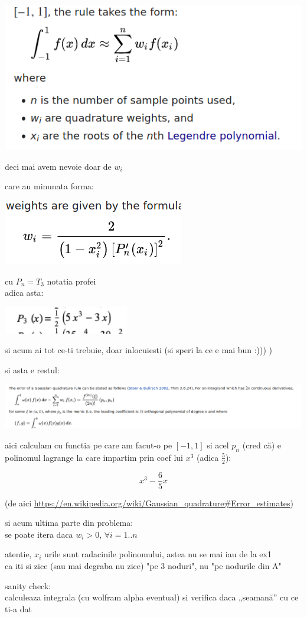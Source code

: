 \documentclass[11pt]{article}
\begin{document}
\begin{center}
\includegraphics[width=.6\linewidth]{./formula.png}
\end{center}

deci mai avem nevoie doar de \(w_i\)
\medskip

care au minunata forma:

\begin{center}
\includegraphics[width=.4\linewidth]{./w_i.png}
\end{center}

cu \(P_n = T_3\) notatia profei\\
adica asta:

\begin{center}
\includegraphics[width=.4\linewidth]{./lagrange3.png}
\end{center}

si acum ai tot ce-ti trebuie, doar inlocuiesti
(si speri la ce e mai bun :))) )
\medskip

si asta e restul:

\begin{center}
\includegraphics[width=\linewidth]{./rest.png}
\end{center}

aici calculam cu functia pe care am facut-o pe \([-1, 1]\)
si acel \(p_n\) (cred că) e polinomul lagrange la care impartim prin coef lui \(x^3\) (adica \(\frac{5}{2}\)):

\[x^3 - \frac{6}{5} x\]

(de aici
\url{https://en.wikipedia.org/wiki/Gaussian\_quadrature\#Error\_estimates})

\medskip

si acum ultima parte din problema:\\
se poate itera daca \(w_i > 0\), \(\forall i = 1..n\)
\medskip

atentie, \(x_i\) urile sunt radacinile polinomului, astea nu se mai iau de la ex1\\
ca iti si zice (sau mai degraba nu zice) "pe 3 noduri", nu "pe nodurile din A"

sanity check:\\
calculeaza integrala (cu wolfram alpha eventual) si verifica daca „seamană” cu ce ti-a dat
\end{document}
